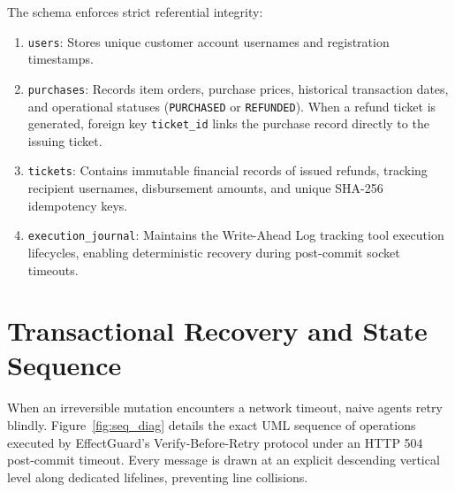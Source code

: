 The schema enforces strict referential integrity:
\begin{enumerate}
    \item \texttt{users}: Stores unique customer account usernames and registration timestamps.
    \item \texttt{purchases}: Records item orders, purchase prices, historical transaction dates, and operational statuses (\texttt{PURCHASED} or \texttt{REFUNDED}). When a refund ticket is generated, foreign key \texttt{ticket\_id} links the purchase record directly to the issuing ticket.
    \item \texttt{tickets}: Contains immutable financial records of issued refunds, tracking recipient usernames, disbursement amounts, and unique SHA-256 idempotency keys.
    \item \texttt{execution\_journal}: Maintains the Write-Ahead Log tracking tool execution lifecycles, enabling deterministic recovery during post-commit socket timeouts.
\end{enumerate}

\section{Transactional Recovery and State Sequence}

When an irreversible mutation encounters a network timeout, naive agents retry blindly. Figure~\ref{fig:seq_diag} details the exact UML sequence of operations executed by EffectGuard's Verify-Before-Retry protocol under an HTTP 504 post-commit timeout. Every message is drawn at an explicit descending vertical level along dedicated lifelines, preventing line collisions.

